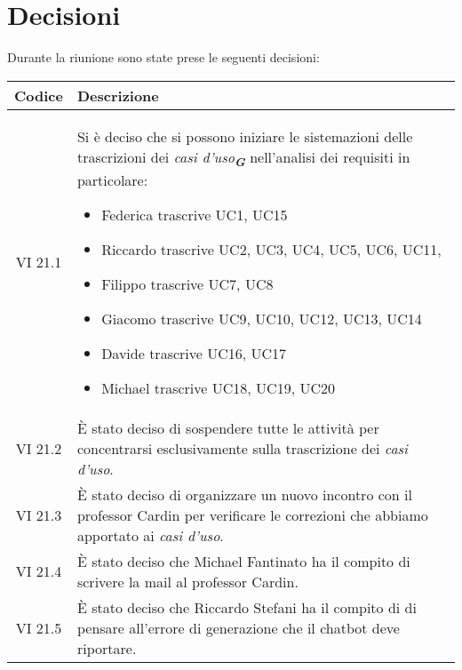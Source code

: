 
\section{Decisioni}

Durante la riunione sono state prese le seguenti decisioni:

\vspace{0.5cm}

\begin{table}[htbp]
    \centering
    \begin{tabular}{|c|p{}|}
        \hline
        \rowcolor[gray]{0.75}
        \textbf{Codice} & \textbf{Descrizione}\\
        \hline
        VI 21.1 & Si è deciso che si possono iniziare le sistemazioni delle trascrizioni dei \emph{casi d'uso}\textsubscript{\textit{\textbf{G}}} nell'analisi dei requisiti in particolare: 
        \begin{itemize}
            \item Federica trascrive UC1, UC15
            \item Riccardo trascrive UC2, UC3, UC4, UC5, UC6, UC11, 
            \item Filippo trascrive UC7, UC8
            \item Giacomo trascrive UC9, UC10, UC12, UC13, UC14
            \item Davide trascrive UC16, UC17
            \item Michael trascrive UC18, UC19, UC20
        \end{itemize} \\
        \hline
        VI 21.2 & È stato deciso di sospendere tutte le attività per concentrarsi esclusivamente sulla trascrizione dei \emph{casi d'uso}. \\
        \hline
        VI 21.3 & È stato deciso di organizzare un nuovo incontro con il professor Cardin per verificare le correzioni che abbiamo apportato ai \emph{casi d'uso}.\\
        \hline
        VI 21.4 & È stato deciso che Michael Fantinato ha il compito di scrivere la mail al professor Cardin.\\
        \hline
        VI 21.5 & È stato deciso che Riccardo Stefani ha il compito di di pensare all'errore di generazione che il chatbot deve riportare.\\

\end{tabular}
\end{table}
